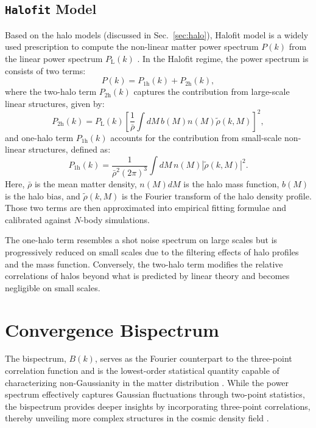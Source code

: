 \subsection{\texttt{Halofit} Model}
Based on the halo models (discussed in Sec.~\ref{sec:halo}), Halofit model is a widely used prescription to compute the non-linear matter power spectrum \( P(k) \) from the linear power spectrum \( P_{\mathrm{L}}(k) \) \citep{2003MNRAS.341.1311S, 2012ApJ...761..152T}. In the Halofit regime, the power spectrum is consists of two terms:
\begin{equation}
    P(k) = P_{\mathrm{1h}}(k) + P_{\mathrm{2h}}(k),
    \label{eq:halofit_model}
\end{equation}
where the two-halo term \( P_{\mathrm{2h}}(k) \) captures the contribution from large-scale linear structures, given by:   
\begin{equation}
    P_{\mathrm{2h}}(k) = P_{\mathrm{L}}(k) \left[ \frac{1}{\bar{\rho}} \int dM \, b(M) n(M) \tilde{\rho}(k, M) \right]^2,
    \label{eq:halofit_1h}
\end{equation}
and one-halo term $P_{\mathrm{1h}}(k)$ accounts for the contribution from small-scale non-linear structures, defined as:
\begin{equation}
    P_{\mathrm{1h}}(k) = \frac{1}{\bar{\rho}^2 (2\pi)^3} \int dM \, n(M) \left| \tilde{\rho}(k, M) \right|^2.
    \label{eq:halofit_2h}
\end{equation}
Here, \( \bar{\rho} \) is the mean matter density, \( n(M) dM \) is the halo mass function, \( b(M) \) is the halo bias, and \( \tilde{\rho}(k, M) \) is the Fourier transform of the halo density profile. 
Those two terms are then approximated into empirical fitting formulae and calibrated against \( N \)-body simulations.

The one-halo term resembles a shot noise spectrum on large scales but is progressively reduced on small scales due to the filtering effects of halo profiles and the mass function. Conversely, the two-halo term modifies the relative correlations of halos beyond what is predicted by linear theory and becomes negligible on small scales. 

\section{Convergence Bispectrum}
The bispectrum, \( B(k) \), serves as the Fourier counterpart to the three-point correlation function and is the lowest-order statistical quantity capable of characterizing non-Gaussianity in the matter distribution \citep{2002PhR...367....1B}. While the power spectrum effectively captures Gaussian fluctuations through two-point statistics, the bispectrum provides deeper insights by incorporating three-point correlations, thereby unveiling more complex structures in the cosmic density field \citep{1999ApJ...517..531S, 2004MNRAS.348..897T}.

